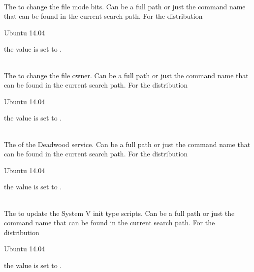 \\

The  to change the file mode bits. Can be a full path or
just the command name that can be found in the current search path. 
For the distribution
\begin{inparaitem}
\item[\TheDistribution{ubuntu}] Ubuntu 14.04
\end{inparaitem}
the value is set to .

\\

The  to change the file owner. Can be a full path or
just the command name that can be found in the current search path. 
For the distribution
\begin{inparaitem}
\item[\TheDistribution{ubuntu}] Ubuntu 14.04
\end{inparaitem}
the value is set to .

\\

The  of the Deadwood service. Can be a full path or
just the command name that can be found in the current search path. 
For the distribution
\begin{inparaitem}
\item[\TheDistribution{ubuntu}] Ubuntu 14.04
\end{inparaitem}
the value is set to .

\\

The  to update the System V init type scripts. Can be a full path or
just the command name that can be found in the current search path. 
For the distribution
\begin{inparaitem}
\item[\TheDistribution{ubuntu}] Ubuntu 14.04
\end{inparaitem}
the value is set to .


